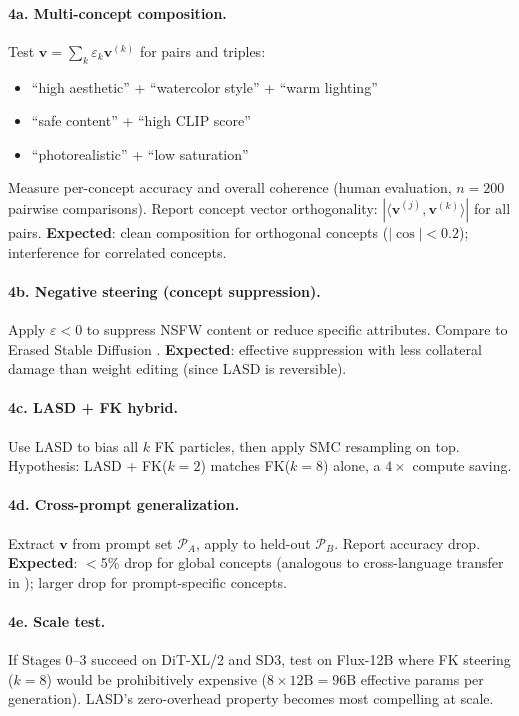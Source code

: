 \documentclass[11pt]{article}
\newcommand{\bv}{\mathbf{v}}
\begin{document}
\paragraph{4a. Multi-concept composition.}
Test $\bv = \sum_k \varepsilon_k \bv^{(k)}$ for pairs and triples:
\begin{itemize}[leftmargin=*]
    \item ``high aesthetic'' + ``watercolor style'' + ``warm lighting''
    \item ``safe content'' + ``high CLIP score''
    \item ``photorealistic'' + ``low saturation''
\end{itemize}
Measure per-concept accuracy and overall coherence (human evaluation, $n = 200$ pairwise comparisons).
Report concept vector orthogonality: $|\langle \bv^{(j)}, \bv^{(k)} \rangle|$ for all pairs.
\textbf{Expected}: clean composition for orthogonal concepts ($|\cos| < 0.2$); interference for correlated concepts.

\paragraph{4b. Negative steering (concept suppression).}
Apply $\varepsilon < 0$ to suppress NSFW content or reduce specific attributes.
Compare to Erased Stable Diffusion \citep{gandikota2023erasing}.
\textbf{Expected}: effective suppression with less collateral damage than weight editing (since LASD is reversible).

\paragraph{4c. LASD + FK hybrid.}
Use LASD to bias all $k$ FK particles, then apply SMC resampling on top.
Hypothesis: LASD + FK($k = 2$) matches FK($k = 8$) alone, a $4\times$ compute saving.

\paragraph{4d. Cross-prompt generalization.}
Extract $\bv$ from prompt set $\mathcal{P}_A$, apply to held-out $\mathcal{P}_B$.
Report accuracy drop.
\textbf{Expected}: $<$5\% drop for global concepts (analogous to cross-language transfer in \citet{beaglehole2026universal}); larger drop for prompt-specific concepts.

\paragraph{4e. Scale test.}
If Stages 0--3 succeed on DiT-XL/2 and SD3, test on Flux-12B where FK steering ($k = 8$) would be prohibitively expensive ($8 \times 12\mathrm{B} = 96\mathrm{B}$ effective params per generation).
LASD's zero-overhead property becomes most compelling at scale.
\end{document}
